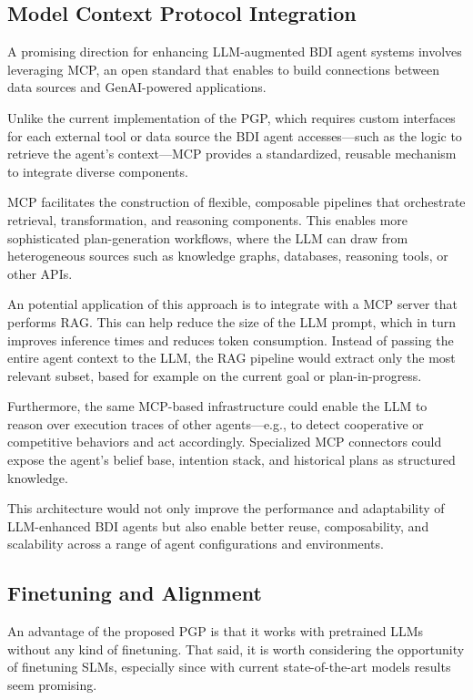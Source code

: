 \documentclass[12pt,a4paper,openright,twoside]{book}
\begin{document}
\subsection{Model Context Protocol Integration}\label{sec:mcp-integration}

A promising direction for enhancing \ac{LLM}-augmented \ac{BDI} agent systems involves leveraging \ac{MCP}, an open standard that enables to build connections between data sources and GenAI-powered applications.

Unlike the current implementation of the \ac{PGP}, which requires custom interfaces for each external tool or data source the BDI agent accesses---such as the logic to retrieve the agent's context---\ac{MCP} provides a standardized, reusable mechanism to integrate diverse components.

\ac{MCP} facilitates the construction of flexible, composable pipelines that orchestrate retrieval, transformation, and reasoning components. 
%
This enables more sophisticated plan-generation workflows, where the \ac{LLM} can draw from heterogeneous sources such as knowledge graphs, databases, reasoning tools, or other APIs.

An potential application of this approach is to integrate with a \ac{MCP} server that performs \ac{RAG}. 
%
This can help reduce the size of the \ac{LLM} prompt, which in turn improves inference times and reduces token consumption. 
%
Instead of passing the entire agent context to the \ac{LLM}, the \ac{RAG} pipeline would extract only the most relevant subset, based for example on the current goal or plan-in-progress.

Furthermore, the same \ac{MCP}-based infrastructure could enable the \ac{LLM} to reason over execution traces of other agents---e.g., to detect cooperative or competitive behaviors and act accordingly. 
%
Specialized \ac{MCP} connectors could expose the agent's belief base, intention stack, and historical plans as structured knowledge.

This architecture would not only improve the performance and adaptability of \ac{LLM}-enhanced BDI agents but also enable better reuse, composability, and scalability across a range of agent configurations and environments.

\subsection{Finetuning and Alignment}\label{sec:finetuning}

An advantage of the proposed PGP is that it works with pretrained LLMs without any kind of finetuning.
%
That said, it is worth considering the opportunity of finetuning \acp{SLM}, especially since with current state-of-the-art models results seem promising.
\end{document}
